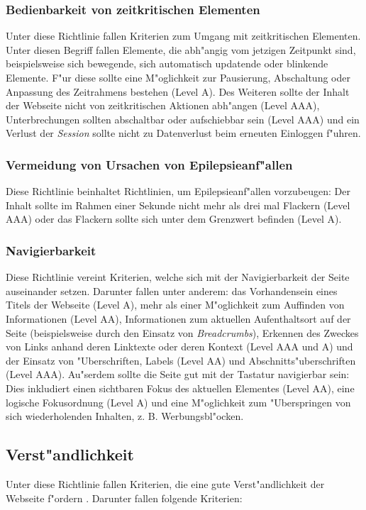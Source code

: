 \documentclass[a4paper,bibtotoc,oneside]{scrbook}
\begin{document}
\subsubsection{Bedienbarkeit von zeitkritischen Elementen}
Unter diese Richtlinie fallen Kriterien zum Umgang mit zeitkritischen Elementen. Unter diesen Begriff fallen Elemente, die abh"angig vom jetzigen Zeitpunkt sind, beispielsweise sich bewegende, sich automatisch updatende oder blinkende Elemente. F"ur diese sollte eine M"oglichkeit zur Pausierung, Abschaltung oder Anpassung des Zeitrahmens bestehen (Level A). Des Weiteren sollte der Inhalt der Webseite nicht von zeitkritischen Aktionen abh"angen (Level AAA), Unterbrechungen sollten abschaltbar oder aufschiebbar sein (Level AAA) und ein Verlust der \emph{Session} sollte nicht zu Datenverlust beim erneuten Einloggen f"uhren. \cite[Abschnitt 2.2]{wcag2}

\subsubsection{Vermeidung von Ursachen von Epilepsieanf"allen}
Diese Richtlinie beinhaltet Richtlinien, um Epilepsieanf"allen vorzubeugen: Der Inhalt sollte im Rahmen einer Sekunde nicht mehr als drei mal Flackern (Level AAA) oder das Flackern sollte sich unter dem Grenzwert befinden (Level A). \cite[Abschnitt 2.3]{wcag2}

\subsubsection{Navigierbarkeit}
Diese Richtlinie vereint Kriterien, welche sich mit der Navigierbarkeit der Seite auseinander setzen. Darunter fallen unter anderem: das Vorhandensein eines Titels der Webseite (Level A), mehr als einer M"oglichkeit zum Auffinden von Informationen (Level AA), Informationen zum aktuellen Aufenthaltsort auf der Seite (beispielsweise durch den Einsatz von \emph{Breadcrumbs}), Erkennen des Zweckes von Links anhand deren Linktexte oder deren Kontext (Level AAA und A) und der Einsatz von "Uberschriften, Labels (Level AA) und Abschnitts"uberschriften (Level AAA). Au"serdem sollte die Seite gut mit der Tastatur navigierbar sein: Dies inkludiert einen sichtbaren Fokus des aktuellen Elementes (Level AA), eine logische Fokusordnung (Level A) und eine M"oglichkeit zum "Uberspringen von sich wiederholenden Inhalten, z. B. Werbungsbl"ocken. \cite[Abschnitt 2.4]{wcag2}



\subsection{Verst"andlichkeit}
Unter diese Richtlinie fallen Kriterien, die eine gute Verst"andlichkeit der Webseite f"ordern \cite[Abschnitt 3]{wcag2}. Darunter fallen folgende Kriterien: 
\end{document}
